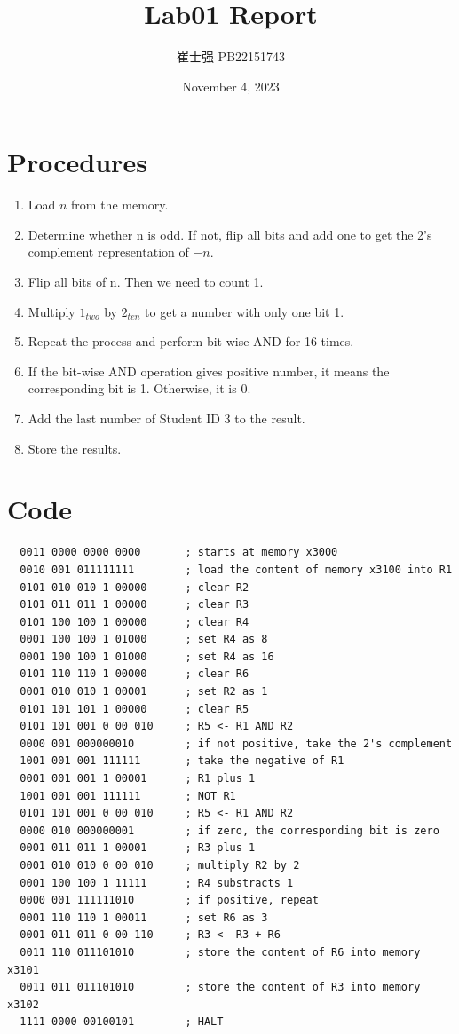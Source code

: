 \documentclass[UTF8]{ctexart}
\title{Lab01 Report}
\author{崔士强 PB22151743}
\date{November 4, 2023}
\begin{document}
\maketitle
\section{Procedures}
\begin{enumerate}
  \item Load $n$ from the memory.
  \item Determine whether n is odd. If not, flip all bits and add one to get the 2's complement representation of $-n$.
  \item Flip all bits of n. Then we need to count 1.
  \item Multiply $1_{two}$ by $2_{ten}$ to get a number with only one bit 1.
  \item Repeat the process and perform bit-wise AND for 16 times.
  \item If the bit-wise AND operation gives positive number, it means the corresponding bit is 1. Otherwise, it is 0.
  \item Add the last number of Student ID 3 to the result.
  \item Store the results.
\end{enumerate}
\section{Code}
\begin{lstlisting}
  0011 0000 0000 0000       ; starts at memory x3000
  0010 001 011111111        ; load the content of memory x3100 into R1
  0101 010 010 1 00000      ; clear R2
  0101 011 011 1 00000      ; clear R3
  0101 100 100 1 00000      ; clear R4
  0001 100 100 1 01000      ; set R4 as 8
  0001 100 100 1 01000      ; set R4 as 16
  0101 110 110 1 00000      ; clear R6
  0001 010 010 1 00001      ; set R2 as 1
  0101 101 101 1 00000      ; clear R5
  0101 101 001 0 00 010     ; R5 <- R1 AND R2
  0000 001 000000010        ; if not positive, take the 2's complement
  1001 001 001 111111       ; take the negative of R1
  0001 001 001 1 00001      ; R1 plus 1
  1001 001 001 111111       ; NOT R1
  0101 101 001 0 00 010     ; R5 <- R1 AND R2
  0000 010 000000001        ; if zero, the corresponding bit is zero
  0001 011 011 1 00001      ; R3 plus 1
  0001 010 010 0 00 010     ; multiply R2 by 2
  0001 100 100 1 11111      ; R4 substracts 1
  0000 001 111111010        ; if positive, repeat
  0001 110 110 1 00011      ; set R6 as 3
  0001 011 011 0 00 110     ; R3 <- R3 + R6
  0011 110 011101010        ; store the content of R6 into memory x3101
  0011 011 011101010        ; store the content of R3 into memory x3102
  1111 0000 00100101        ; HALT  
\end{lstlisting}
\end{document}
